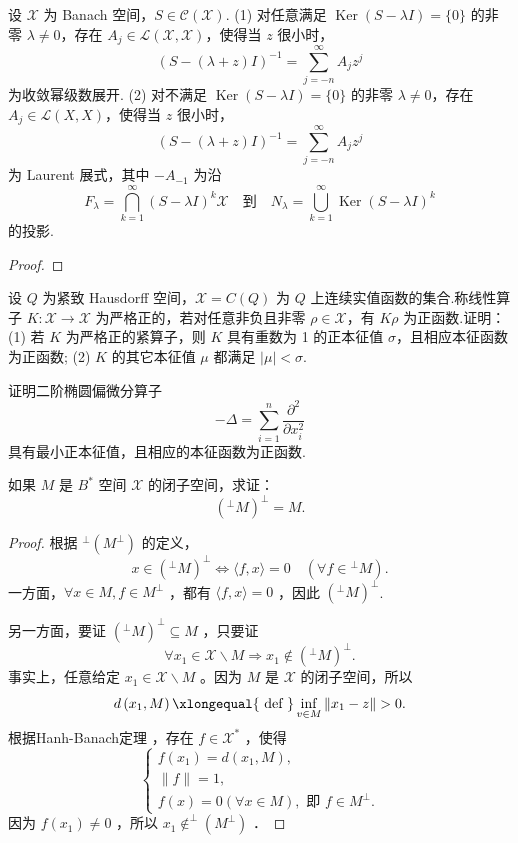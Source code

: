 \documentclass[lang=cn,newtx,10pt,scheme=chinese,thmcnt=chapter]{elegantbook}
\begin{document}
\begin{problemset}
  \item 设 \(\mathcal{X}\) 为 Banach 空间，\(S \in \mathcal{C}(\mathcal{X})\).  
  (1) 对任意满足 \(\operatorname{Ker}(S - \lambda I) = \{0\}\) 的非零 \(\lambda \neq 0\)，存在 \(A_{j} \in \mathcal{L}(\mathcal{X},\mathcal{X})\)，使得当 \(z\) 很小时，
  \[
  (S - (\lambda + z)I)^{-1} = \sum_{j=-n}^{\infty} A_{j} z^{j}
  \]
  为收敛幂级数展开.  
  (2) 对不满足 \(\operatorname{Ker}(S - \lambda I) = \{0\}\) 的非零 \(\lambda \neq 0\)，存在 \(A_{j} \in \mathcal{L}(X,X)\)，使得当 \(z\) 很小时，
  \[
  (S - (\lambda + z)I)^{-1} = \sum_{j=-n}^{\infty} A_{j} z^{j}
  \]
  为 Laurent 展式，其中 \(-A_{-1}\) 为沿
\[
  F_{\lambda} = \bigcap_{k=1}^{\infty}(S - \lambda I)^{k}\mathcal{X}
  \quad \text{到} \quad
  N_{\lambda} = \bigcup_{k=1}^{\infty}\operatorname{Ker}(S - \lambda I)^{k}
  \]
  的投影.
\begin{proof}
    
\end{proof}
  \item* 设 \(Q\) 为紧致 Hausdorff 空间，\(\mathcal{X} = C(Q)\) 为 \(Q\) 上连续实值函数的集合.称线性算子 \(K : \mathcal{X} \to \mathcal{X}\) 为严格正的，若对任意非负且非零 \(\rho \in \mathcal{X}\)，有 \(K\rho\) 为正函数.证明：  
  (1) 若 \(K\) 为严格正的紧算子，则 \(K\) 具有重数为 1 的正本征值 \(\sigma\)，且相应本征函数为正函数;  
  (2) \(K\) 的其它本征值 \(\mu\) 都满足 \(|\mu| < \sigma\).

  \item* 证明二阶椭圆偏微分算子
  \[
  -\Delta = \sum_{i=1}^{n} \frac{\partial^{2}}{\partial x_{i}^{2}}
  \]
  具有最小正本征值，且相应的本征函数为正函数.
  \item 如果 $M$ 是 $B^*$ 空间 $\mathcal{X}$ 的闭子空间，求证：
$$
\left({ }^{\perp}M\right)^{\perp} =M .
$$

\begin{proof}
    根据 ${ }^{\perp}\left(M^{\perp}\right)$ 的定义，
$$
x \in\left({ }^{\perp}M\right)^{\perp} \Leftrightarrow\langle f, x\rangle=0 \quad\left(\forall f \in{}^{\perp} M\right) .
$$
一方面，$\forall x \in M, f \in M^{\perp}$ ，都有 $\langle f, x\rangle=0$ ，因此 $\left({ }^{\perp}M\right)^{\perp} $.

另一方面，要证 $\left({ }^{\perp}M\right)^{\perp} \subseteq M$ ，只要证
$$
\forall x_1 \in \mathcal{X} \backslash M \Rightarrow x_1 \notin\left({ }^{\perp}M\right)^{\perp}  .
$$
事实上，任意给定 $x_1 \in \mathcal{X} \backslash M$ 。因为 $M$ 是 $\mathcal{X}$ 的闭子空间，所以
$$
d\left(x_1, M\right) \xlongequal{\text { def }} \inf _{v \in M}\left\|x_1-z\right\|>0 .
$$
根据Hanh-Banach定理 ，存在 $f \in \mathcal{X}^*$ ，使得
$$
\left\{\begin{array}{l}
f\left(x_1\right)=d\left(x_1, M\right), \\
\|f\|=1, \\
f(x)=0(\forall x \in M), \text { 即 } f \in M^{\perp} .
\end{array}\right.
$$
因为 $f\left(x_1\right) \neq 0$ ，所以 $x_1 \notin^{\perp}\left(M^{\perp}\right)$ ．


\end{proof}
\end{problemset}
\end{document}
